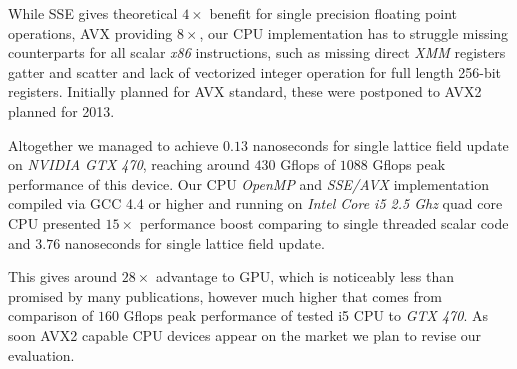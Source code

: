 \documentclass[11pt,a4paper]{article}
\begin{document}
While SSE gives theoretical $4\times$ benefit for single precision floating point operations, AVX providing $8\times$, our CPU implementation has to struggle missing counterparts for all scalar \emph{x86} instructions, such as missing direct \emph{XMM} registers gatter and scatter and lack of vectorized integer operation for full length 256-bit registers. Initially planned for AVX standard, these were postponed to AVX2 planned for 2013.

Altogether we managed to achieve $0.13$ nanoseconds for single lattice field update on \emph{NVIDIA GTX 470}, reaching around $430$ Gflops of $1088$ Gflops peak performance of this device. Our CPU \emph{OpenMP} and \emph{SSE/AVX} implementation compiled via GCC 4.4 or higher and running on \emph{Intel Core i5 2.5 Ghz} quad core CPU presented $15\times$ performance boost comparing to single threaded scalar code and $3.76$ nanoseconds for single lattice field update.

This gives around $28\times$ advantage to GPU, which is noticeably less than promised by many publications, however much higher that comes from comparison of $160$ Gflops peak performance of tested i5 CPU to \emph{GTX 470}. As soon AVX2 capable CPU devices appear on the market we plan to revise our evaluation.

{}

\end{document}
